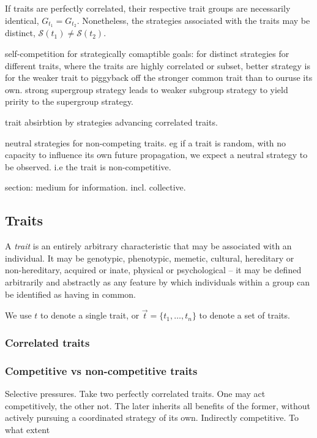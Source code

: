\documentclass[aps,rmp,twocolumn,amsmath,amssymb,nofootinbib,superscriptaddress]{revtex4}
\begin{document}
If traits are perfectly correlated, their respective trait groups are necessarily identical, $G_{t_1}=G_{t_2}$. Nonetheless, the strategies associated with the traits may be distinct, $\mathcal{S}(t_1)\neq\mathcal{S}(t_2)$.

self-competition for strategically comaptible goals:
for distinct strategies for different traits, where the traits are highly correlated or subset, better strategy is for the weaker trait to piggyback off the stronger common trait than to ouruse its own. strong supergroup strategy leads to weaker subgroup strategy to yield pririty to the supergroup strategy.

trait absirbtion by strategies advancing correlated traits. 

neutral strategies for non-competing traits. eg if a trait is random, with no capacity to influence its own future propagation, we expect a neutral strategy to be observed. i.e the trait is non-competitive.

section: medium for information. incl. collective.

\subsection{Traits}

A \textit{trait} is an entirely arbitrary characteristic that may be associated with an individual. It may be genotypic, phenotypic, memetic, cultural, hereditary or non-hereditary, acquired or inate, physical or psychological -- it may be defined arbitrarily and abstractly as any feature by which individuals within a group can be identified as having in common.

We use $t$ to denote a single trait, or $\vec t=\{t_1,\dots,t_n\}$ to denote a set of traits.

\subsubsection{Correlated traits}

\subsubsection{Competitive vs non-competitive traits}

Selective pressures. Take two perfectly correlated traits. One may act competitively, the other not. The later inherits all benefits of the former, without actively pursuing a coordinated strategy of its own. Indirectly competitive. To what extent 
\end{document}
